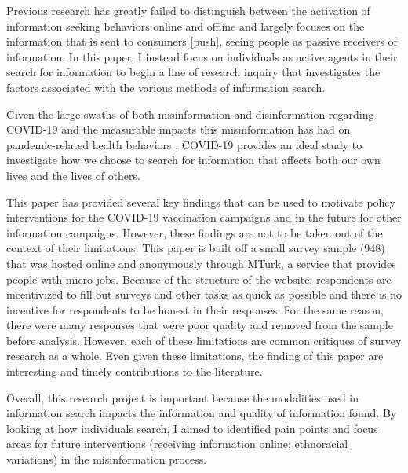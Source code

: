 Previous research has greatly failed to distinguish between the activation of
information seeking behaviors online and offline and largely focuses on the
information that is sent to consumers [push], seeing people as passive receivers
of information. In this paper, I instead focus on individuals as active agents
in their search for information to begin a line of research inquiry that
investigates the factors associated with the various methods of information
search.

Given the large swaths of both misinformation and disinformation regarding
COVID-19 \citep{pathakInfodemicsCOVID19Role2020, mottaHowRightLeaningMedia2020,
shahsavariConspiracyTimeCorona2020} and the measurable impacts this
misinformation has had on pandemic-related health behaviors
\citep{loombaMeasuringImpactCOVID192021, greene_murphy21}, COVID-19 provides an
ideal study to investigate how we choose to search for information that affects
both our own lives and the lives of others.

This paper has provided several key findings that can be used to motivate policy
interventions for the COVID-19 vaccination campaigns and in the future for other
information campaigns. However, these findings are not to be taken out of the
context of their limitations. This paper is built off a small survey sample
(948) that was hosted online and anonymously through MTurk, a service that
provides people with micro-jobs. Because of the structure of the website,
respondents are incentivized to fill out surveys and other tasks as quick as
possible and there is no incentive for respondents to be honest in their
responses. For the same reason, there were many responses that were poor quality
and removed from the sample before analysis. However, each of these limitations
are common critiques of survey research as a whole. Even given these
limitations, the finding of this paper are interesting and timely contributions
to the literature.

Overall, this research project is important because the modalities used in
information search impacts the information and quality of information found. By
looking at how individuals search, I aimed to identified pain points and focus areas
for future interventions (receiving information online; ethnoracial variations) 
in the misinformation process.